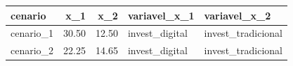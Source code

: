 \begin{table}[ht]
\centering
\begin{tabular}{lrrll}
  \hline
cenario & x\_1 & x\_2 & variavel\_x\_1 & variavel\_x\_2 \\ 
  \hline
cenario\_1 & 30.50 & 12.50 & invest\_digital & invest\_tradicional \\ 
  cenario\_2 & 22.25 & 14.65 & invest\_digital & invest\_tradicional \\ 
   \hline
\end{tabular}
\end{table}
